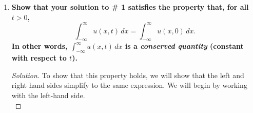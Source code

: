 \documentclass[11pt]{article}
\newenvironment{solution}
  {\renewcommand\qedsymbol{$\blacksquare$}\begin{proof}[Solution]}
  {\end{proof}}
\begin{document}
\begin{enumerate}
\begin{solution}
Factoring out a $e^{-\frac{x^2 \cdot \frac{t}{t+1}}{4t}} = e^{-\frac{x^2}{4(t+1)}}$ term from the integrand, we get that
\[ u(x, t) = \frac{1}{\sqrt{4\pi t}} e^{-\frac{x^2}{4(t+1)}}\int_{-\infty}^{\infty} e^{-\frac{(t+1)\left(y-\frac{x}{t+1}\right)^2}{4t}}\, dy \]

We will now make a substitution to transform the integrand into $e^{-r^2}$: let \[r = \frac{\left(y-\frac{x}{t+1}\right)\sqrt{t+1}}{\sqrt{4t}}.\]
Then we also have that \[ dr = \frac{\sqrt{t+1}}{\sqrt{4t}} \, dy. \]

Making the substitution for $r$ in our solution $u(x, t)$, we find that 
\begin{align*} u(x, t) &= \frac{1}{\sqrt{4\pi t}} e^{-\frac{x^2}{4(t+1)}}\int_{y = -\infty}^{y = \infty} e^{-\frac{(t+1)\left(y-\frac{x}{t+1}\right)^2}{4t}}\, dy \\
&= \frac{1}{\sqrt{\pi(t+1)}} e^{-\frac{x^2}{4(t+1)}} \int_{r = -\infty}^{r = \infty} e^{-r^2} \, dr. \end{align*}

But we also know that $\int_{-\infty}^{\infty} e^{-r^2} \, dr = \sqrt{\pi}$, so plugging this back into our solution, we find that
\begin{align*} u(x, t) &= \frac{1}{\sqrt{\pi(t+1)}} e^{-\frac{x^2}{4(t+1)}} \int_{r = -\infty}^{r = \infty} e^{-r^2} \, dr \\
&= \left(\frac{1}{\sqrt{\pi(t+1)}} e^{-\frac{x^2}{4(t+1)}}\right) \cdot \sqrt{\pi} \\
&= \frac{1}{\sqrt{t+1}} e^{-\frac{x^2}{4(t+1)}}. \end{align*}

Thus, our solution to the given diffusion PDE with the given initial value is
\[ \boxed{u(x, t) = \frac{1}{\sqrt{t+1}} e^{-\frac{x^2}{4(t+1)}}.}\]
	

\end{solution}

\newpage

\item \textbf{Show that your solution to \# 1 satisfies the property that, for all $t > 0$,}
\[ \int_{-\infty}^{\infty} u(x, t) \, dx = \int_{-\infty}^{\infty} u(x, 0) \, dx.  \]
\textbf{In other words, $\int_{-\infty}^{\infty} u(x, t) \, dx$ is a \textit{conserved quantity} (constant with respect to $t$). }

\begin{solution}To show that this property holds, we will show that the left and right hand sides simplify to the same expression. We will begin by working with the left-hand side. \\


\end{solution}
\end{enumerate}
\end{document}
